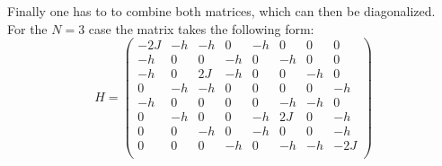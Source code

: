 \documentclass{article}
\begin{document}
Finally one has to to combine both matrices, which can then be
diagonalized.\\
For the $N = 3$ case the matrix takes the following form:
\begin{equation*}
\label{eq:23}
H = 
\begin{pmatrix}
-2J & -h & -h &  0& -h & 0 &0 &0 \\
-h &0 &0 & -h &  0& -h & 0& 0\\
-h & 0& 2J & -h & 0& 0& -h &0 \\
 0& -h & -h&0 & 0& 0& 0& -h\\
-h &0 &0 &0 &0 & -h & -h &0 \\
 0& -h &0 &0 & -h & 2J &0 & -h\\
 0& 0& -h & 0& -h &0 &0 & -h\\
 0& 0& 0& -h & 0& -h & -h & -2J\\
\end{pmatrix}
\end{equation*}
\end{document}
